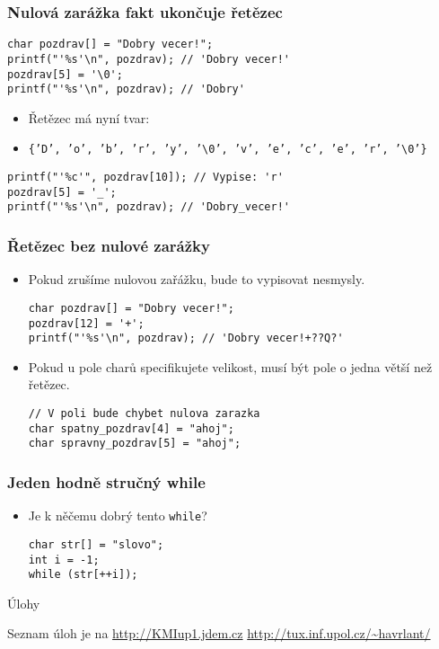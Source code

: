 \documentclass{beamer}
\newenvironment{itemizex}%
  {\large \begin{itemize}%
    \setlength{\itemsep}{8pt}%
    \setlength{\parskip}{8pt}}%
  {\end{itemize}}
\begin{document}
\begin{frame}[t,fragile]\frametitle{Nulová zarážka fakt ukončuje řetězec} 
    \begin{verbatim} 
char pozdrav[] = "Dobry vecer!";
printf("'%s'\n", pozdrav); // 'Dobry vecer!'
pozdrav[5] = '\0';
printf("'%s'\n", pozdrav); // 'Dobry'
    \end{verbatim}
    \begin{itemizex}
        \item Řetězec má nyní tvar:
        \item \texttt{\{'D', 'o', 'b', 'r', 'y', '\textbackslash0', 'v', 'e', 'c', 'e', 'r', '\textbackslash0'\}}
    \end{itemizex}
    \begin{verbatim} 
printf("'%c'", pozdrav[10]); // Vypise: 'r'
pozdrav[5] = '_';
printf("'%s'\n", pozdrav); // 'Dobry_vecer!'
    \end{verbatim}
\end{frame}


\begin{frame}[t,fragile]\frametitle{Řetězec bez nulové zarážky} 
    \begin{itemizex}
        \item Pokud zrušíme nulovou zařážku, bude to vypisovat nesmysly.
        \begin{verbatim} 
char pozdrav[] = "Dobry vecer!";
pozdrav[12] = '+';
printf("'%s'\n", pozdrav); // 'Dobry vecer!+??Q?'
        \end{verbatim}
        \item Pokud u pole charů specifikujete velikost, musí být pole o jedna větší než řetězec.
        \begin{verbatim} 
// V poli bude chybet nulova zarazka
char spatny_pozdrav[4] = "ahoj"; 
char spravny_pozdrav[5] = "ahoj";
        \end{verbatim}
    \end{itemizex}
\end{frame}


\begin{frame}[t,fragile]\frametitle{Jeden hodně stručný while} 
    \begin{itemizex}
        \item Je k něčemu dobrý tento \texttt{while}?
        \begin{verbatim} 
char str[] = "slovo";
int i = -1;
while (str[++i]);
    \end{verbatim}
    \end{itemizex}
\end{frame}


\begin{frame}[t,fragile]{Úlohy}
\begin{center}
\vskip 1cm
{\Large Seznam úloh je na \url{http://KMIup1.jdem.cz}}
\vskip 2cm
\url{http://tux.inf.upol.cz/~havrlant/}
\end{center}
\end{frame}
\end{document}
